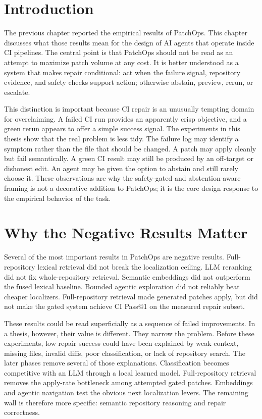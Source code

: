 \section{Introduction}

The previous chapter reported the empirical results of PatchOps. This chapter discusses what those results mean
for the design of AI agents that operate inside CI pipelines. The central point is that PatchOps should not be
read as an attempt to maximize patch volume at any cost. It is better understood as a system that makes repair
conditional: act when the failure signal, repository evidence, and safety checks support action; otherwise
abstain, preview, rerun, or escalate.

This distinction is important because CI repair is an unusually tempting domain for overclaiming. A failed CI
run provides an apparently crisp objective, and a green rerun appears to offer a simple success signal. The
experiments in this thesis show that the real problem is less tidy. The failure log may identify a symptom
rather than the file that should be changed. A patch may apply cleanly but fail semantically. A green CI result
may still be produced by an off-target or dishonest edit. An agent may be given the option to abstain and still
rarely choose it. These observations are why the safety-gated and abstention-aware framing is not a decorative
addition to PatchOps; it is the core design response to the empirical behavior of the task.

\section{Why the Negative Results Matter}

Several of the most important results in PatchOps are negative results. Full-repository lexical retrieval did
not break the localization ceiling. LLM reranking did not fix whole-repository retrieval. Semantic embeddings
did not outperform the fused lexical baseline. Bounded agentic exploration did not reliably beat cheaper
localizers. Full-repository retrieval made generated patches apply, but did not make the gated system achieve
CI Pass@1 on the measured repair subset.

These results could be read superficially as a sequence of failed improvements. In a thesis, however, their
value is different. They narrow the problem. Before these experiments, low repair success could have been
explained by weak context, missing files, invalid diffs, poor classification, or lack of repository search. The
later phases remove several of those explanations. Classification becomes competitive with an LLM through a
local learned model. Full-repository retrieval removes the apply-rate bottleneck among attempted gated patches.
Embeddings and agentic navigation test the obvious next localization levers. The remaining wall is therefore
more specific: semantic repository reasoning and repair correctness.

